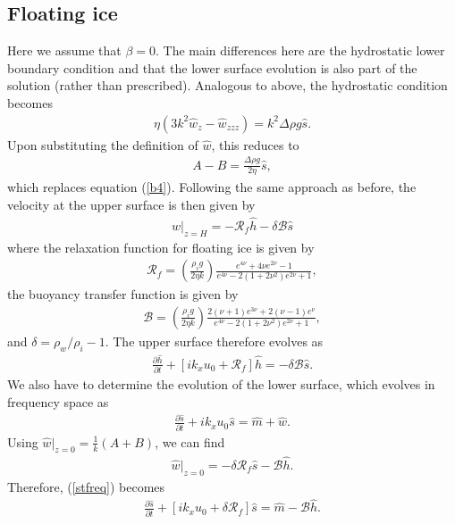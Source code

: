 \documentclass[paper=a4, fontsize=11pt]{article}
\begin{document}
\subsection*{Floating ice}
Here we assume that $\beta=0$.
The main differences here are the hydrostatic lower boundary condition
and that the lower surface evolution is also part of the solution (rather than prescribed).
Analogous to above, the hydrostatic condition becomes
\begin{align}
\eta (3k^2 \widehat{w}_{z}-\widehat{w}_{zzz})  = k^2 \Delta\rho g \widehat{s}. \label{b4alt}
\end{align}
Upon substituting the definition of $\widehat{w}$, this reduces to
\begin{align}
A-B = \frac{\Delta \rho g}{2\eta}\widehat{s},
\end{align}
which replaces equation (\ref{b4}).
Following the same approach as before, the velocity at the upper surface is then given by
\begin{align}
w|_{z=H} =  -\mathcal{R}_f\widehat{h} - \delta\mathcal{B}\widehat{s}
\end{align}
where the relaxation function for floating ice is given by
\begin{align}
\mathcal{R}_f = \left(\frac{\rho_i g}{2\eta k}\right) \frac{e^{4\nu} +4\nu e^{2\nu} -1 }{e^{4\nu} -2(1+2\nu^2)e^{2\nu} +1},
\end{align}
the buoyancy transfer function is given by
\begin{align}
\mathcal{B} = \left(\frac{\rho_i g}{2\eta k}\right) \frac{ 2(\nu+1)e^{3\nu}+2(\nu-1)e^{\nu} }{e^{4\nu} -2(1+2\nu^2)e^{2\nu} +1},
\end{align}
and $\delta = \rho_w/\rho_i -1$.
The upper surface therefore evolves as
\begin{align}
\frac{\partial \widehat{h}}{\partial t}+ \left[ik_xu_0  + \mathcal{R}_f\right]\widehat{h} = -\delta\mathcal{B}\widehat{s}.
\end{align}
We also have to determine the evolution of the lower surface, which evolves in frequency space as
\begin{align}
\frac{\partial \widehat{s}}{\partial t}+ ik_xu_0 \widehat{s} = \widehat{m} + \widehat{w}. \label{stfreq}
\end{align}
Using $\widehat{w}|_{z=0}= \frac{1}{k}(A+B)$, we can find
\begin{align}
\widehat{w}|_{z=0} = -\delta\mathcal{R}_f\widehat{s} - \mathcal{B} \widehat{h}.
\end{align}
Therefore, (\ref{stfreq}) becomes
\begin{align}
\frac{\partial \widehat{s}}{\partial t}+ [ik_xu_0 + \delta\mathcal{R}_f]\widehat{s} = \widehat{m} - \mathcal{B} \widehat{h}.
\end{align}
\end{document}
